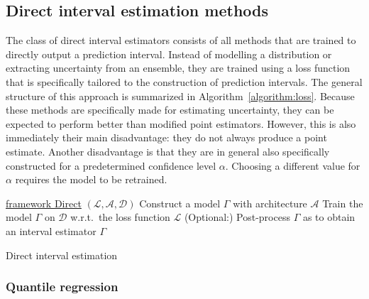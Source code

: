 \documentclass[smallcondensed]{svjour3}
\let\oldnl\nl%
\newcommand{\nonl}{\renewcommand{\nl}{\let\nl\oldnl}}%
\begin{document}
\subsection{Direct interval estimation methods}\label{section:loss}

    The class of direct interval estimators consists of all methods that are trained to directly output a prediction interval. Instead of modelling a distribution or extracting uncertainty from an ensemble, they are trained using a loss function that is specifically tailored to the construction of prediction intervals. The general structure of this approach is summarized in Algorithm~\ref{algorithm:loss}. Because these methods are specifically made for estimating uncertainty, they can be expected to perform better than modified point estimators. However, this is also immediately their main disadvantage: they do not always produce a point estimate. Another disadvantage is that they are in general also specifically constructed for a predetermined confidence level $\alpha$. Choosing a different value for $\alpha$ requires the model to be retrained.

    \begin{algorithm}[t!]

        \nonl\underline{framework Direct} $(\mathcal{L}, \mathcal{A}, \mathcal{D})$\;
        Construct a model $\Gamma$ with architecture $\mathcal{A}$\;
        Train the model $\Gamma$ on $\mathcal{D}$ w.r.t.\ the loss function $\mathcal{L}$\;
        (Optional:) Post-process $\Gamma$ as to obtain an interval estimator\;
        \KwRet $\Gamma$
        \caption{Direct interval estimation}
        \label{algorithm:loss}
    \end{algorithm}

\subsubsection*{Quantile regression}
\end{document}
